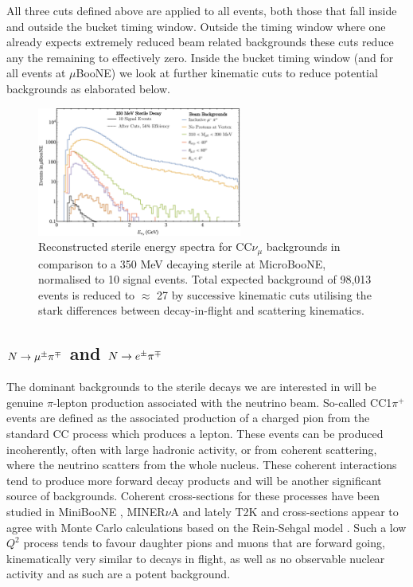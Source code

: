 \documentclass[11pt, a4paper]{article}
\def\muboone{MicroBooNE}
\def\minerva{MINER$\nu$A}
\def\ster{\ensuremath N}
\begin{document}
All three cuts defined above are applied to all events, both those that fall inside and outside the bucket timing window. Outside the timing window where one already expects extremely reduced beam related backgrounds these cuts reduce any the remaining to effectively zero. Inside the bucket timing window (and for all events at $\mu$BooNE) we look at further kinematic cuts to reduce potential backgrounds as elaborated below.

\begin{figure}[h]
\center
\includegraphics[width=0.6\textwidth,clip,trim=0 0 0 0]{figures/mu_pi_cutflow.pdf}

\caption{\label{fig:mu_pi_cutflow} Reconstructed sterile energy spectra for
CC$\nu_\mu$ backgrounds in comparison to a 350 MeV decaying sterile at
\muboone, normalised to 10 signal events. Total expected background of 98,013
events is reduced to $\approx$ 27 by successive kinematic cuts utilising
the stark differences between decay-in-flight and scattering kinematics. }

\end{figure}

\subsection{$\ster \rightarrow \mu^\pm \pi^\mp$ and $\ster \rightarrow e^\pm \pi^\mp$   }

The dominant backgrounds to the sterile decays we are interested in will be
genuine $\pi$-lepton production associated with the neutrino beam. So-called
CC1$\pi^+$ events are defined as the associated production of a charged pion
from the standard CC process which produces a lepton. These events can be
produced incoherently, often with large hadronic activity, or from coherent
scattering, where the neutrino scatters from the whole nucleus. These coherent
interactions tend to produce more forward decay products and will be another
significant source of backgrounds. Coherent cross-sections for these processes
have been studied in MiniBooNE \cite{Wascko:2006tx}, \minerva
\cite{Eberly:2014mra} and lately T2K and cross-sections appear to agree with
Monte Carlo calculations based on the Rein-Sehgal model \cite{Rein:2006di,
Rein:1982pf}.  Such a low $Q^2$ process tends to favour daughter pions and
muons that are forward going, kinematically very similar to decays in flight,
as well as no observable nuclear activity and as such are a potent
background.\\ 
\end{document}
